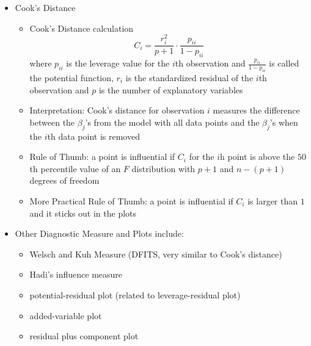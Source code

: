 \documentclass[12pt]{article}
\begin{document}
\begin{itemize}
\item Cook's Distance \begin{itemize} 
\item Cook's Distance calculation $$ C_i = \frac{r_i^2}{p+1} \cdot \frac{p_{ii}}{1 - p_{ii}} $$ where $p_{ii}$ is the leverage value for the $i$th observation and $\frac{p_{ii}}{1-p_{ii}}$ is called the potential function, $r_i$ is the standardized residual of the $i$th observation and $p$ is the number of explanatory variables 
\item Interpretation: Cook's distance for observation $i$ measures the difference between the $\beta_j$'s from the model with all data points and the $\beta_j$'s when the $i$th data point is removed 
\item Rule of Thumb: a point is influential if $C_i$ for the $i$h point is above the $50$th percentile value of an $F$ distribution with $p+1$ and $n-(p+1)$ degrees of freedom 
\item More Practical Rule of Thumb: a point is influential if $C_i$ is larger than $1$ and it sticks out in the plots \end{itemize} 
\item Other Diagnostic Measure and Plots include: \begin{itemize} 
\item Welsch and Kuh Measure (DFITS, very similar to Cook's distance)
\item Hadi's influence measure 
\item potential-residual plot (related to leverage-residual plot)
\item added-variable plot
\item residual plus component plot \end{itemize} 
\end{itemize}
\end{document}
